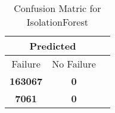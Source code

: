 \begin{table}[] 
\caption{Confusion Matric for IsolationForest} 
\label{Table: Prediction Accuracy-NoneIsolationForest75.0EKF-ignoreReflection-Reflection} 
\centering 
\begin{tabular} 
 {@{}ccc@{}} 
\toprule 
\multicolumn{2}{c}{\textbf{Predicted}}
 \\ \midrule 
\multicolumn{1}{|c|}{Failure} & 
\multicolumn{1}{c|}{No Failure}
 \\ \midrule 
\multicolumn{1}{|c|}{\color{green}\textbf{163067}} & 
\multicolumn{1}{c|}{\color{green}\textbf{0}}
 \\ \midrule 
\multicolumn{1}{|c|}{\color{red}\textbf{7061}} & 
\multicolumn{1}{c|}{\color{green}\textbf{0}}
 \\ \bottomrule 
\end{tabular} 
\end{table} 
